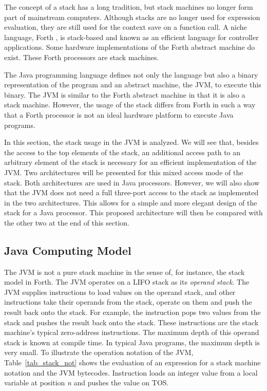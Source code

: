 
The concept of a stack has a long tradition, but stack machines no
longer form part of mainstream computers. Although stacks are no
longer used for expression evaluation, they are still used for the
context save on a function call. A niche language, Forth
\cite{Koopman89}, is stack-based and known as an efficient language
for controller applications. Some hardware implementations of the
Forth abstract machine do exist. These Forth processors are stack
machines.

The Java programming language defines not only the language but also
a binary representation of the program and an abstract machine, the
JVM, to execute this binary. The JVM is similar to the Forth
abstract machine in that it is also a stack machine. However, the
usage of the stack differs from Forth in such a way that a Forth
processor is not an ideal hardware platform to execute Java
programs.

In this section, the stack usage in the JVM is analyzed. We will see
that, besides the access to the top elements of the stack, an
additional access path to an arbitrary element of the stack is
necessary for an efficient implementation of the JVM. Two
architectures will be presented for this mixed access mode of the
stack. Both architectures are used in Java processors. However, we
will also show that the JVM does not need a full three-port access
to the stack as implemented in the two architectures. This allows
for a simple and more elegant design of the stack for a Java
processor. This proposed architecture will then be compared with the
other two at the end of this section.

\subsection{Java Computing Model}

The JVM is not a pure stack machine in the sense of, for instance,
the stack model in Forth. The JVM operates on a LIFO stack as its
\emph{operand stack}. The JVM supplies instructions to load values
on the operand stack, and other instructions take their operands
from the stack, operate on them and push the result back onto the
stack. For example, the  instruction pops two values from
the stack and pushes the result back onto the stack. These
instructions are the stack machine's typical zero-address
instructions. The maximum depth of this operand stack is known at
compile time. In typical Java programs, the maximum depth is very
small. To illustrate the operation notation of the JVM,
Table~\ref{tab_stack_not} shows the evaluation of an expression for
a stack machine notation and the JVM bytecodes. Instruction
 loads an integer value from a local variable at
position \emph{n} and pushes the value on TOS.


